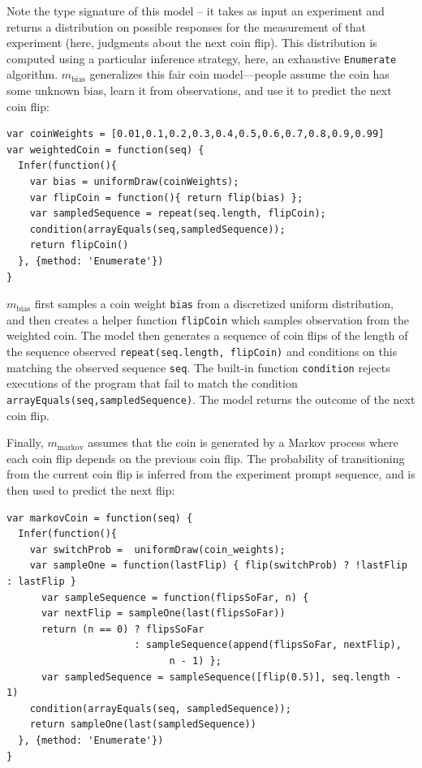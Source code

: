 \documentclass{article}
\begin{document}
Note the type signature of this model -- it takes as input an experiment and returns a distribution on possible responses for the measurement of that experiment (here, judgments about the next coin flip).
This distribution is computed using a particular inference strategy, here, an exhaustive \lstinline{Enumerate} algorithm.
$m_{\text{bias}}$ generalizes this fair coin model---people assume the coin has some unknown bias, learn it from observations, and use it to predict the next coin flip:

\begin{lstlisting}[caption=Biased coin model,  label={lst:m_weighted}]
var coinWeights = [0.01,0.1,0.2,0.3,0.4,0.5,0.6,0.7,0.8,0.9,0.99]
var weightedCoin = function(seq) {
  Infer(function(){
    var bias = uniformDraw(coinWeights);
    var flipCoin = function(){ return flip(bias) };
    var sampledSequence = repeat(seq.length, flipCoin);
    condition(arrayEquals(seq,sampledSequence));
    return flipCoin()
  }, {method: 'Enumerate'})
}
\end{lstlisting}

$m_{\text{bias}}$ first samples a coin weight \lstinline{bias} from a discretized uniform distribution, and
then creates a helper function \lstinline{flipCoin} which samples observation from the weighted coin.
The model then generates a sequence of coin flips of the length of the sequence observed \lstinline{repeat(seq.length, flipCoin)} and conditions on this matching the observed sequence \lstinline{seq}.
The built-in function \lstinline{condition} rejects executions of the program that fail to match the condition \lstinline{arrayEquals(seq,sampledSequence)}.
The model returns the outcome of the next coin flip.

Finally, $m_{\text{markov}}$ assumes that the coin is generated by a Markov process where each coin flip depends on the previous coin flip.
The probability of transitioning from the current coin flip is inferred from the experiment prompt sequence, and is  then used to predict the next flip:

\begin{lstlisting}[caption=Markov coin model]
var markovCoin = function(seq) {
  Infer(function(){
    var switchProb =  uniformDraw(coin_weights);
    var sampleOne = function(lastFlip) { flip(switchProb) ? !lastFlip : lastFlip }
 	  var sampleSequence = function(flipsSoFar, n) {
      var nextFlip = sampleOne(last(flipsSoFar))
      return (n == 0) ? flipsSoFar
                      : sampleSequence(append(flipsSoFar, nextFlip),
                      		n - 1) };
	  var sampledSequence = sampleSequence([flip(0.5)], seq.length - 1)
    condition(arrayEquals(seq, sampledSequence));
    return sampleOne(last(sampledSequence))
  }, {method: 'Enumerate'})
}
\end{lstlisting}
\end{document}
